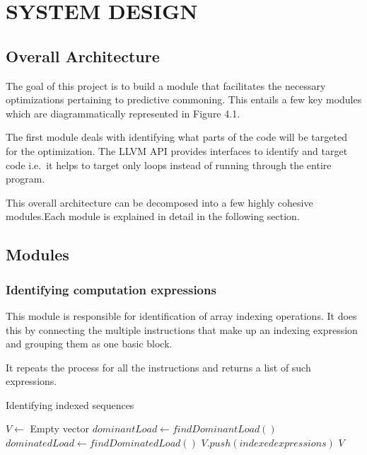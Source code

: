 \chapter{SYSTEM DESIGN} %

\section{Overall Architecture}
The goal of this project is to build a module that facilitates the necessary optimizations pertaining to predictive commoning. This entails a few key modules which are diagrammatically represented in Figure 4.1.
\newline

The first module deals with identifying what parts of the code will be targeted for the optimization. The LLVM API provides interfaces to identify and target code i.e.\ it helps to target only loops instead of running through the entire program. 

This overall architecture can be decomposed into a few highly cohesive modules.Each module is explained in detail in the following section.

\section{Modules}
\subsection{Identifying computation expressions}

This module is responsible for identification of array indexing operations. It does this by connecting the multiple instructions that make up an indexing expression and grouping them as one basic block.

It repeats the process for all the instructions and returns a list of such expressions.

\begin{algorithm}
	\caption{Identifying indexed sequences}
	\begin{algorithmic}
		\STATE $V \leftarrow$ Empty vector
		\STATE $dominantLoad \leftarrow findDominantLoad()$
		\STATE $dominatedLoad \leftarrow findDominatedLoad()$
		\STATE $V.push(indexed expressions)$
		\ENDIF
		\ENDFOR
		\RETURN $V$
	\end{algorithmic}
\end{algorithm}


